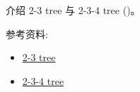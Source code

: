 \documentclass[a4paper, justified]{tufte-handout}
\begin{document}
\beginot

\begin{ot}
  介绍 2-3 tree 与 2-3-4 tree ()。

  \noindent 参考资料:
  \begin{itemize}
    \item \href{https://en.wikipedia.org/wiki/2\%E2\%80\%933\_tree}{2-3 tree}
    \item \href{https://en.wikipedia.org/wiki/2\%E2\%80\%933\%E2\%80\%934\_tree}{2-3-4 tree}
  \end{itemize}
\end{ot}

% 




\beginfb

% 
% 
\end{document}
